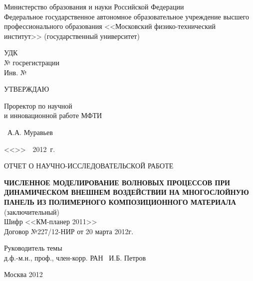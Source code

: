 \begin{titlepage}
\newpage

\begin{center}
Министерство образования и науки Российской Федерации\\
Федеральное государственное автономное образовательное учреждение высшего профессионального образования <<Московский физико-технический институт>> (государственный университет)\\
\end{center}

\vspace{0.5em}

\noindent
\begin{minipage}[t]{0.5\textwidth}
УДК\\
№ госрегистрации\\
Инв. №
\end{minipage}
\begin{minipage}[t]{0.5\textwidth}
\centering УТВЕРЖДАЮ
\begin{flushleft}
Проректор по научной \\
и инновационной работе МФТИ
\end{flushleft}
\begin{flushright}
\hrulefill ~А.А. Муравьев
\end{flushright}
\begin{flushright}
<<\underline{\hspace{10 mm}}>>\ \hrulefill\ 2012~г.
\end{flushright}
\end{minipage}

\vspace{2em}

\begin{center}
ОТЧЕТ О НАУЧНО-ИССЛЕДОВАТЕЛЬСКОЙ РАБОТЕ
\end{center}

\vspace{0.5em}

\begin{center}
\textsc{\textbf{ЧИСЛЕННОЕ МОДЕЛИРОВАНИЕ ВОЛНОВЫХ ПРОЦЕССОВ ПРИ ДИНАМИЧЕСКОМ ВНЕШНЕМ ВОЗДЕЙСТВИИ НА МНОГОСЛОЙНУЮ ПАНЕЛЬ ИЗ ПОЛИМЕРНОГО КОМПОЗИЦИОННОГО МАТЕРИАЛА}} \\
(заключительный) \\
Шифр <<КМ-планер 2011>> \\
Договор №227/12-НИР от 20 марта 2012г.
\end{center}

\vspace{2em}

\begin{flushleft}
\vspace{1.5em}
Руководитель темы \\
д.ф.-м.н., проф., член-корр. РАН \hrulefill ~И.Б. Петров
\end{flushleft}

\vspace{\fill}
\begin{center}
Москва 2012
\end{center}

\end{titlepage}
